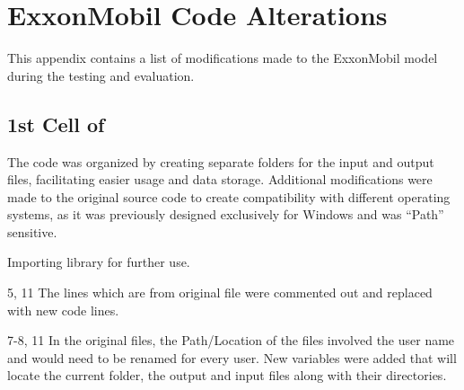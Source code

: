 \chapter{ExxonMobil Code Alterations}
\label{ch:appendixexxonmobil}
This appendix contains a list of modifications made to the ExxonMobil model during the testing and evaluation.

\section{1st Cell of }

The code was organized by creating separate folders for the input and output files, facilitating easier usage and data storage. Additional modifications were made to the original source code to create compatibility with different operating systems, as it was previously designed exclusively for Windows and was ``Path'' sensitive.

\begin{codemodifications}

\begin{codemodification}{1}
Importing  library for further use.
\end{codemodification}

\begin{codemodification}{5, 11}
The lines which are from original file were commented out and replaced with new code lines.
\end{codemodification}

\begin{codemodification}{7-8, 11}
In the original files, the Path/Location of the files involved the user name and would need to be renamed for every user.  New variables were added that will locate the current folder, the output and input files along with their directories.
\end{codemodification}

\end{codemodifications}

